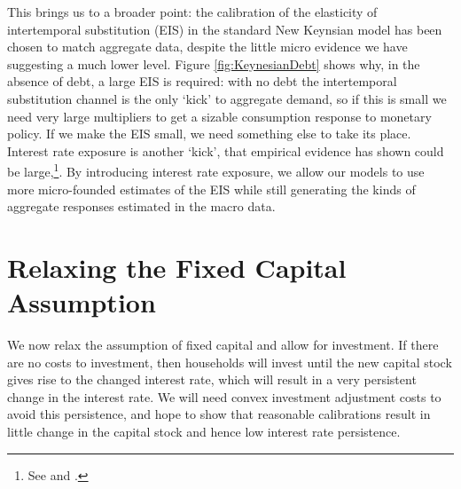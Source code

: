 \documentclass[titlepage]{\econtex}\newcommand{\texname}{ConsumptionHeterogeneity}
\begin{document}
This brings us to a broader point: the calibration of the elasticity of intertemporal substitution (EIS) in the standard New Keynsian model has been chosen to match aggregate data, despite the little micro evidence we have suggesting a much lower level. Figure \ref{fig:KeynesianDebt} shows why, in the absence of debt, a large EIS is required: with no debt the intertemporal substitution channel is the only `kick' to aggregate demand, so if this is small we need very large multipliers to get a sizable consumption response to monetary policy. If we make the EIS small, we need something else to take its place. Interest rate exposure is another `kick', that empirical evidence has shown could be large,\footnote{See \cite{auclert_monetary_2017} and \cite{ckConsumption}.}. By introducing interest rate exposure, we allow our models to use more micro-founded estimates of the EIS while still generating the kinds of aggregate responses estimated in the macro data.

\section{Relaxing the Fixed Capital Assumption}
We now relax the assumption of fixed capital and allow for investment. If there are no costs to investment, then households will invest until the new capital stock gives rise to the changed interest rate, which will result in a very persistent change in the interest rate. We will need convex investment adjustment costs to avoid this persistence, and hope to show that reasonable calibrations result in little change in the capital stock and hence low interest rate persistence.
\end{document}
